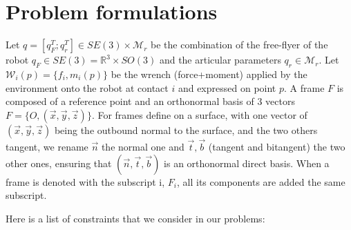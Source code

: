 \section{Problem formulations}
\label{sec:problem_formulations}

Let $q=[q_F^T; q_r^T]\in SE(3)\times \mathcal{M}_r$ be the combination of the free-flyer of the robot $q_F\in SE(3) = \mathbb{R}^3 \times SO(3)$ and the articular parameters $q_r\in\mathcal{M}_r$.
Let $\mathcal{W}_i(p)=\{f_i,m_i(p)\}$ be the wrench (force+moment) applied by the environment onto the robot at contact $i$ and expressed on point $p$.
A frame $F$ is composed of a reference point and an orthonormal basis of 3 vectors $F = \{O, (\vec{x}, \vec{y}, \vec{z})\}$.
For frames define on a surface, with one vector of $(\vec{x}, \vec{y}, \vec{z})$ being the outbound normal to the surface, and the two others tangent, we rename $\vec{n}$ the normal one and $\vec{t}, \vec{b}$ (tangent and bitangent) the two other ones, ensuring that $(\vec{n}, \vec{t}, \vec{b})$ is an orthonormal direct basis.
When a frame is denoted with the subscript i, $F_i$, all its components are added the same subscript.

Here is a list of constraints that we consider in our problems:

